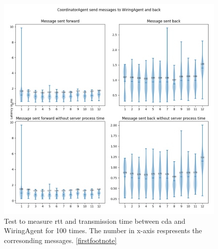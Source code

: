 \begin{figure}[p]
    \includegraphics[width=\textwidth]{figures/appendix/usecase/violin_CoordinatorAgent_to_WiringAgent.png}
    \centering
    \caption{Test to measure \gls{rtt} and transmission time between \gls{cda} and 
    WiringAgent for 100 times. The number in x-axis respresents the 
    corresonding messages. \protect\ref{firstfootnote}}
    \label{fig: violin-CDA-WI}
\end{figure}


